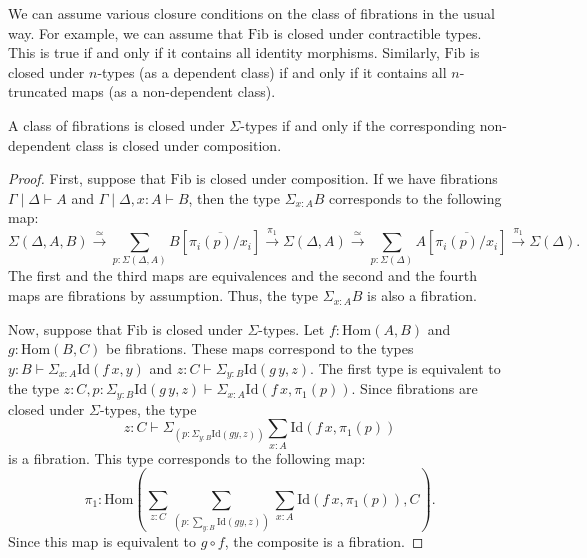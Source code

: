 \documentclass[reqno]{mscs}
\newcommand{\fs}[1]{\mathrm{#1}}
\newcommand{\Hom}{\fs{Hom}}
\newcommand{\Id}{\fs{Id}}
\newcommand{\Fib}{\fs{Fib}}
\numberwithin{figure}{section}
\begin{document}
We can assume various closure conditions on the class of fibrations in the usual way.
For example, we can assume that $\Fib$ is closed under contractible types.
This is true if and only if it contains all identity morphisms.
Similarly, $\Fib$ is closed under $n$-types (as a dependent class) if and only if it contains all $n$-truncated maps (as a non-dependent class).

\begin{prop}
A class of fibrations is closed under $\Sigma$-types if and only if the corresponding non-dependent class is closed under composition.
\end{prop}
\begin{proof}
First, suppose that $\Fib$ is closed under composition.
If we have fibrations $\Gamma \mid \Delta \vdash A$ and $\Gamma \mid \Delta, x : A \vdash B$, then the type $\Sigma_{x : A} B$ corresponds to the following map:
\[ \Sigma(\Delta, A, B) \xrightarrow{\simeq} \sum_{p : \Sigma(\Delta, A)} B[\overline{\pi_i(p)/x_i}] \xrightarrow{\pi_1} \Sigma(\Delta, A) \xrightarrow{\simeq} \sum_{p : \Sigma(\Delta)} A[\overline{\pi_i(p)/x_i}] \xrightarrow{\pi_1} \Sigma(\Delta). \]
The first and the third maps are equivalences and the second and the fourth maps are fibrations by assumption.
Thus, the type $\Sigma_{x : A} B$ is also a fibration.

Now, suppose that $\Fib$ is closed under $\Sigma$-types.
Let $f : \Hom(A,B)$ and $g : \Hom(B,C)$ be fibrations.
These maps correspond to the types $y : B \vdash \Sigma_{x : A} \Id(f\,x,y)$ and $z : C \vdash \Sigma_{y : B} \Id(g\,y,z)$.
The first type is equivalent to the type $z : C, p : \Sigma_{y : B} \Id(g\,y,z) \vdash \Sigma_{x : A} \Id(f\,x,\pi_1(p))$.
Since fibrations are closed under $\Sigma$-types, the type
\[ z : C \vdash \Sigma_{(p : \Sigma_{y : B} \Id(g y, z))} \sum_{x : A} \Id(f\,x,\pi_1(p)) \]
is a fibration.
This type corresponds to the following map:
\[ \pi_1 : \Hom(\sum_{z : C} \sum_{(p : \sum_{y : B} \Id(g y, z))} \sum_{x : A} \Id(f\,x,\pi_1(p)), C). \]
Since this map is equivalent to $g \circ f$, the composite is a fibration.
\end{proof}
\end{document}
